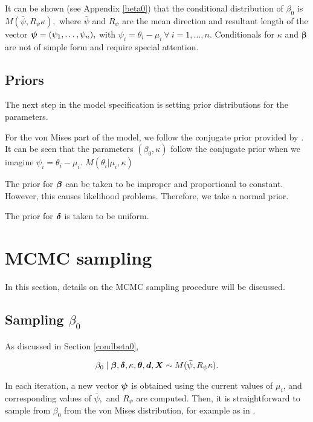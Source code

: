 \documentclass[10pt,a4paper]{article}\usepackage[]{graphicx}\usepackage[]{color}
\begin{document}
It can be shown (see Appendix \ref{beta0}) that the conditional distribution of \( \beta_0 \) is \( M(\bar\psi, R_{\psi} \kappa), \) where \( \bar\psi \) and \( R_\psi \) are the mean direction and resultant length of the vector \( \boldsymbol{\psi} = (\psi_1, \dots, \psi_n),\) with \( \psi_i = \theta_i - \mu_i ~  \forall ~ i = 1, \dots, n.\)   Conditionals for \( \kappa \) and \( \boldsymbol\beta \) are not of simple form and require special attention. \label{condbeta0}


\subsection{Priors}

The next step in the model specification is setting prior distributions for the parameters.

For the von Mises part of the model, we follow the conjugate prior provided by \citet{guttorp1988finding}. It can be seen that the parameters \( (\beta_0, \kappa) \) follow the conjugate prior when we imagine \( \psi_i = \theta_i - \mu_i \).
\( M(\theta_i \vert \mu_i, \kappa) \)

The prior for \( \boldsymbol{\beta} \) can be taken to be improper and proportional to constant. However, this causes likelihood problems. Therefore, we take a normal prior.

The prior for \( \boldsymbol{\delta} \) is taken to be uniform.






\section{MCMC sampling}

In this section, details on the MCMC sampling procedure will be discussed.

\subsection{Sampling $\beta_0$}

As discussed in Section \ref{condbeta0},

\[ \beta_0 \mid \boldsymbol{\beta}, \boldsymbol{\delta}, \kappa, \boldsymbol{\theta}, \boldsymbol{d}, \boldsymbol{X} \sim  M(\bar\psi, R_{\psi} \kappa).\]

In each iteration, a new vector \( \boldsymbol{\psi} \) is obtained using the current values of $\mu_i$, and corresponding values of \( \bar\psi, \) and \( R_{\psi} \) are computed. Then, it is straightforward to sample from \( \beta_0 \) from the von Mises distribution, for example as in \citet{fisher1995statistical}.
\end{document}
